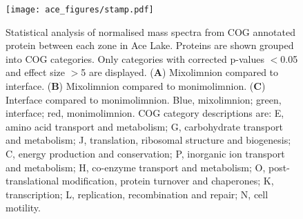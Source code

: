 \begin{figure}
\centering
\texttt{[image: ace\_figures/stamp.pdf]}
\caption[Statistical analysis of Ace Lake metaproteome]{ Statistical analysis of normalised mass spectra from \ac{COG} annotated protein between each zone in Ace Lake. 
Proteins are shown grouped into \ac{COG} categories.
Only categories with corrected p-values $<$0.05 and effect size $>$5 are displayed.
(\textbf{A}) Mixolimnion compared to interface. 
(\textbf{B}) Mixolimnion compared to monimolimnion.
(\textbf{C}) Interface compared to monimolimnion. 
Blue, mixolimnion; green, interface; red, monimolimnion.
\ac{COG} category descriptions are: E, amino acid transport and metabolism; G, carbohydrate transport and metabolism; J, translation, ribosomal structure and biogenesis; C, energy production and conservation; P, inorganic ion transport and metabolism; H, co-enzyme transport and metabolism; O, post-translational modification, protein turnover and chaperones; K, transcription; L, replication, recombination and repair; N, cell motility.
}
\label{fig:stamp}

\end{figure}

